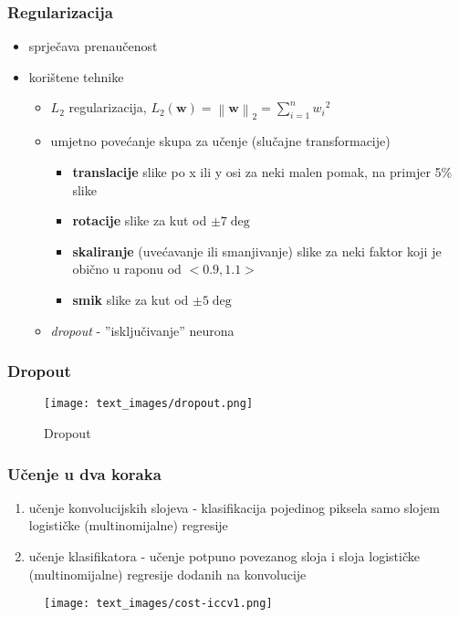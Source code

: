 \documentclass[utf8]{beamer}
\newcommand{\norm}[1]{\left\lVert#1\right\rVert}
\begin{document}

\begin{frame}
\frametitle{Regularizacija}

\begin{itemize}
  \item sprječava prenaučenost
  \item korištene tehnike
  \begin{itemize}
    \item $L_2$ regularizacija, $L_2(\boldsymbol{w}) = \norm{\boldsymbol{w}}_2 = \sum_{i = 1}^{n} {w_i}^2$
    \item umjetno povećanje skupa za učenje (slučajne transformacije)
    \begin{itemize}
      \item
        \textbf{translacije} slike po x ili y osi za neki malen pomak, na primjer 5\% slike
      \item
        \textbf{rotacije} slike za kut od $\pm 7\deg$
      \item
        \textbf{skaliranje} (uvećavanje ili smanjivanje) slike za neki faktor koji je obično u raponu od $<0.9, 1.1>$
      \item
        \textbf{smik} slike za kut od $\pm 5\deg$
    \end{itemize}
    \item \textit{dropout} - ''isključivanje'' neurona
  \end{itemize}
\end{itemize}

\end{frame}


\begin{frame}
\frametitle{Dropout}

\begin{figure}[htb]
\centering
\texttt{[image: text\_images/dropout.png]}
\caption{Dropout}
\end{figure}

\end{frame}


\begin{frame}
\frametitle{Učenje u dva koraka}

\begin{enumerate}
  \item učenje konvolucijskih slojeva - klasifikacija pojedinog piksela samo slojem logističke (multinomijalne) regresije
  \item učenje klasifikatora - učenje potpuno povezanog sloja i sloja logističke (multinomijalne) regresije dodanih na konvolucije
\end{enumerate}

\begin{figure}[htb]
  \centering
  \texttt{[image: text\_images/cost-iccv1.png]}
\end{figure}

\end{frame}
\end{document}
